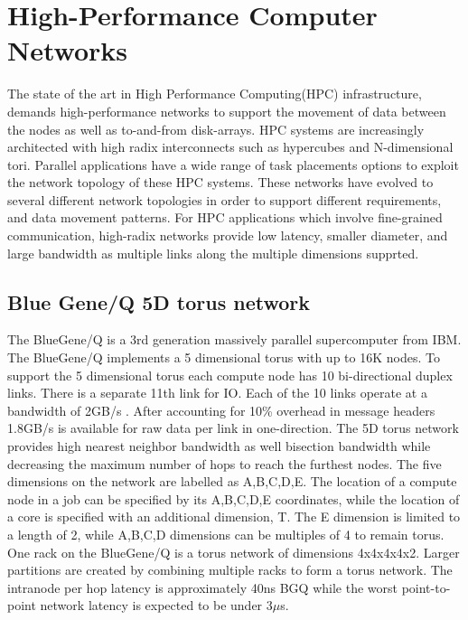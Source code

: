 \documentclass{acm_proc_article-sp}
\begin{document}
\section{High-Performance Computer Networks}

The state of the art in High Performance Computing(HPC) infrastructure, demands high-performance networks
to support the movement of data between the nodes as well as to-and-from disk-arrays. HPC systems are
increasingly architected with high radix interconnects such as hypercubes and N-dimensional tori.
Parallel applications have a wide range of task placements options to exploit the network topology of
these HPC systems. These networks have evolved to several different network topologies in order to support
different requirements, and data movement patterns. For HPC applications which involve fine-grained communication,
high-radix networks provide low latency, smaller diameter, and large bandwidth as multiple links along the multiple
dimensions supprted.

\subsection{Blue Gene/Q 5D torus network}

The BlueGene/Q is a 3rd generation massively parallel supercomputer from IBM. The BlueGene/Q implements a 5 dimensional torus with up to 16K nodes.
To support the 5 dimensional torus each compute node has 10 bi-directional duplex links. There is a separate 11th link for IO. Each of the 10 links
operate at a bandwidth of 2GB/s \cite{BGQ_RedBook_2013}. After accounting for 10\% overhead in message headers 1.8GB/s is available for raw data per link in one-direction.
The 5D torus network provides high nearest neighbor bandwidth as well bisection bandwidth while decreasing the maximum number of hops to reach
the furthest nodes. The five dimensions on the network are labelled as
A,B,C,D,E.  The location of a compute node in a job can be specified
by its A,B,C,D,E coordinates, while the location of a core is specified
with an additional dimension, T. The E dimension is limited to a length
of 2, while A,B,C,D dimensions can be multiples of 4 to remain torus.
One rack on the BlueGene/Q is a torus network of dimensions 4x4x4x4x2.
Larger partitions are created by combining multiple racks to form a torus network.
  The intranode per hop latency is approximately 40ns BGQ \cite{BGQ_Interconnect_2012}
while the worst point-to-point network latency is expected to be under 3$\mu$s. 
\end{document}
